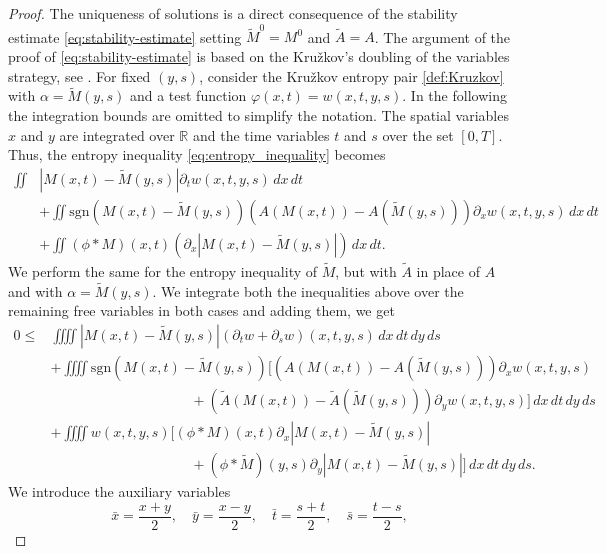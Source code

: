 \documentclass[11pt,a4paper,oneside]{amsart}
\newcommand\R{\mathbb{R}}
\newcommand{\sgn}{\text{sgn}}
\begin{document}
\begin{proof}
        The uniqueness of solutions is a direct consequence of the stability estimate \eqref{eq:stability-estimate} setting $\tilde M^0=M^0$ and $\tilde A=A$. 
        The argument of the proof of \eqref{eq:stability-estimate} is based on the Kru\v{z}kov's doubling of the variables strategy, see \cite{Kruzkov1970}. 
        For fixed $(y,s)$, consider the Kru\v{z}kov entropy pair \eqref{def:Kruzkov} with $\alpha=\tilde M(y,s)$ and a test function $\varphi(x,t)=w(x,t,y,s)$. 
        In the following the integration bounds are omitted to simplify the notation. The spatial variables $x$ and $y$ are integrated over $\R$ 
        and the time variables $t$ and $s$ over the set $[0,T]$.
        Thus, the entropy inequality \eqref{eq:entropy_inequality} becomes 
        \begin{align*}
            \iint &|M(x,t)-\tilde M(y,s)|\partial_t w(x,t,y,s)\,dx\,dt\\
            &+\iint \sgn(M(x,t)-\tilde M(y,s))(A(M(x,t))-A(\tilde M(y,s)))\partial_x w(x,t,y,s)\,dx\,dt\\
            &+\iint (\phi\ast M)(x,t)(\partial_x|M(x,t)-\tilde M(y,s)|)\,dx\,dt.
        \end{align*}
         We perform the same for the entropy inequality of $\tilde M$, but with $\tilde A$ in place of $A$ and with $\alpha=\tilde M(y,s)$. 
         We integrate both the inequalities above over the remaining free variables in both cases and adding them, we get
         \begin{equation} \label{eq:doubling-Kruzkov}
             \begin{aligned}
            0 \leq &\iiiint|M(x,t)-\tilde M(y,s)|(\partial_t w + \partial_s w)(x,t,y,s)\,dx\,dt\,dy\,ds\\
            & + \iiiint \sgn(M(x,t)-\tilde M(y,s))[(A(M(x,t))-A(\tilde M(y,s)))\partial_x w(x,t,y,s)\\
            & \hspace{10em}+ (\tilde A(M(x,t))-\tilde A(\tilde M(y,s)))\partial_y w(x,t,y,s)]\,dx\,dt\,dy\,ds\\
            & + \iiiint w(x,t,y,s)[(\phi\ast M)(x,t)\partial_x|M(x,t)-\tilde M(y,s)|\\
            & \hspace{10em}+ (\phi\ast \tilde M)(y,s)\partial_y|M(x,t)-\tilde M(y,s)|]\,dx\,dt\,dy\,ds.
        \end{aligned}
        \end{equation}
        We introduce the auxiliary variables
        $$
        \bar x= \frac{x+y}{2},\quad \bar y= \frac{x-y}{2},\quad \bar t= \frac{s+t}{2},\quad \bar s= \frac{t-s}{2},
$$
\end{proof}
\end{document}
